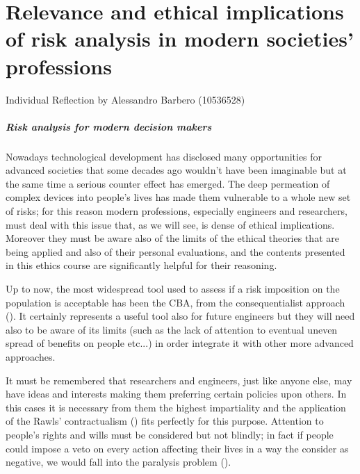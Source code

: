 \chapter{Relevance and ethical implications of risk analysis in modern societies’ professions}

\begin{flushright}
Individual Reflection by Alessandro Barbero (10536528)
\end{flushright}

\paragraph{Risk analysis for modern decision makers}
Nowadays technological development has disclosed many opportunities for advanced societies that some decades ago wouldn't have been imaginable but at the same time a serious counter effect has emerged. The deep permeation of complex devices into people’s lives has made them vulnerable to a whole new set of risks; for this reason modern professions, especially engineers and researchers, must deal with this issue that, as we will see, is dense of ethical implications. Moreover they must be aware also of the limits of the ethical theories that are being applied and also of their personal evaluations, and the contents presented in this ethics course are significantly helpful for their reasoning. 

Up to now, the most widespread tool used to assess if a risk imposition on the population is acceptable has been the CBA, from the consequentialist approach (\cite{Pereira2017DistributiveTransportation}). It certainly represents a useful tool also for future engineers but they will need also to be aware of its limits (such as the lack of attention to eventual uneven spread of benefits on people etc...) in order integrate it with other more advanced approaches.

It must be remembered that researchers and engineers, just like anyone else, may have ideas and interests making them preferring certain policies upon others. In this cases it is necessary from them the highest impartiality and the application of the Rawls' contractualism (\cite{Pereira2017DistributiveTransportation}) fits perfectly for this purpose. Attention to people's rights and wills must be considered but not blindly; in fact if people could impose a veto on every action affecting their lives in a way the consider as negative, we would fall into the paralysis problem (\cite{Hayenhjelm2012TheLiterature}).

